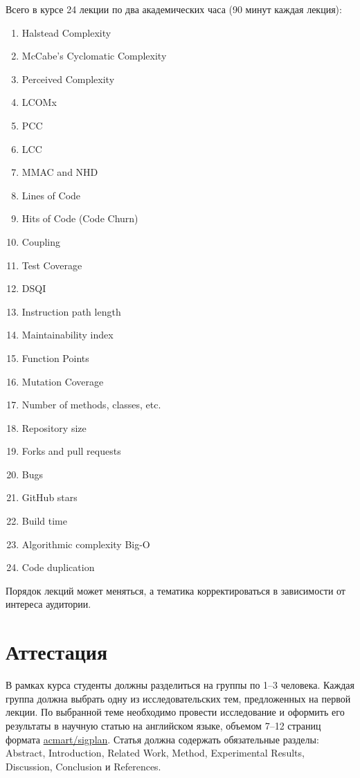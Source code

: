 \documentclass[nobrand,anonymous,nodate,nosecurity]{huawei}
\begin{document}
Всего в курсе 24 лекции по два академических часа (90 минут каждая лекция):
\begin{enumerate}
    \setlength\itemsep{0em}
    \item Halstead Complexity
    \item McCabe's Cyclomatic Complexity
    \item Perceived Complexity
    \item LCOMx
    \item PCC
    \item LCC
    \item MMAC and NHD
    \item Lines of Code
    \item Hits of Code (Code Churn)
    \item Coupling
    \item Test Coverage
    \item DSQI
    \item Instruction path length
    \item Maintainability index
    \item Function Points
    \item Mutation Coverage
    \item Number of methods, classes, etc.
    \item Repository size
    \item Forks and pull requests
    \item Bugs
    \item GitHub stars
    \item Build time
    \item Algorithmic complexity Big-O
    \item Code duplication
\end{enumerate}

Порядок лекций может меняться, а тематика корректироваться в зависимости от интереса аудитории.

\section{Аттестация}

В рамках курса студенты должны разделиться на группы по 1--3 человека. Каждая группа должна выбрать одну из исследовательских тем, предложенных на первой лекции. По выбранной теме необходимо провести исследование и оформить его результаты в научную статью на английском языке, объемом 7--12 страниц формата \href{https://ctan.org/pkg/acmart}{acmart/sigplan}. Статья должна содержать обязательные разделы: Abstract, Introduction, Related Work, Method, Experimental Results, Discussion, Conclusion и References.
\end{document}

